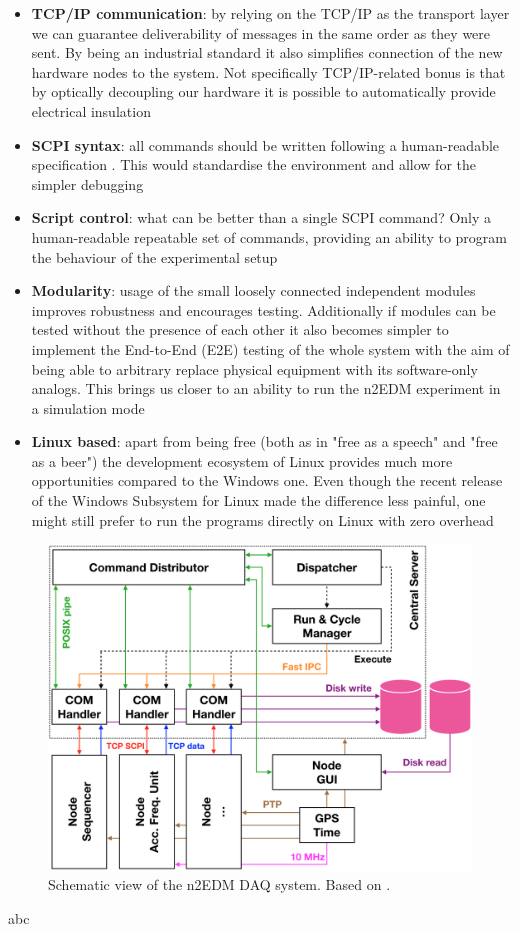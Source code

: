 \begin{itemize}
	\item \textbf{TCP/IP communication}: by relying on the TCP/IP as the transport layer we can guarantee deliverability of messages in the same order as they were sent. By being an industrial standard it also simplifies connection of the new hardware nodes to the system. Not specifically TCP/IP-related bonus is that by optically decoupling our hardware it is possible to automatically provide electrical insulation
	\item \textbf{SCPI syntax}: all commands should be written following a human-readable specification \cite{SCPIConsortium1999}. This would standardise the environment and allow for the simpler debugging
	\item \textbf{Script control}: what can be better than a single SCPI command? Only a human-readable repeatable set of commands, providing an ability to program the behaviour of the experimental setup
	\item \textbf{Modularity}: usage of the small loosely connected independent modules improves robustness and encourages testing. Additionally if modules can be tested without the presence of each other it also becomes simpler to implement the End-to-End (E2E) testing of the whole system with the aim of being able to arbitrary replace physical equipment with its software-only analogs. This brings us closer to an ability to run the n2EDM experiment in a simulation mode
	\item \textbf{Linux based}: apart from being free (both as in "free as a speech" and "free as a beer") the development ecosystem of Linux provides much more opportunities compared to the Windows one. Even though the recent release \cite{Loewen2019} of the Windows Subsystem for Linux made the difference less painful, one might still prefer to run the programs directly on Linux with zero overhead
\end{itemize}

\begin{figure}[h]
	\centering
	\includegraphics[width=.99\textwidth]{img/daq_schema}
	\caption{Schematic view of the n2EDM DAQ system. Based on \cite{Bison2018}.}
\end{figure}

abc